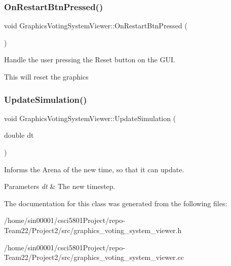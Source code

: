 \subsubsection{\texorpdfstring{On\+Restart\+Btn\+Pressed()}{OnRestartBtnPressed()}}
{\footnotesize\ttfamily void Graphics\+Voting\+System\+Viewer\+::\+On\+Restart\+Btn\+Pressed (\begin{DoxyParamCaption}{ }\end{DoxyParamCaption})}



Handle the user pressing the Reset button on the G\+UI. 

This will reset the graphics \mbox{\label{classGraphicsVotingSystemViewer_a13ebb27a0162188b69b1bd01d29e45d5}} 
\subsubsection{\texorpdfstring{Update\+Simulation()}{UpdateSimulation()}}
{\footnotesize\ttfamily void Graphics\+Voting\+System\+Viewer\+::\+Update\+Simulation (\begin{DoxyParamCaption}\item[{double}]{dt }\end{DoxyParamCaption})\hspace{0.3cm}{\ttfamily [override]}}



Informs the Arena of the new time, so that it can update. 


\begin{DoxyParams}{Parameters}
{\em dt} & The new timestep. \\
\hline
\end{DoxyParams}


The documentation for this class was generated from the following files\+:\begin{DoxyCompactItemize}
\item 
/home/sin00001/csci5801\+Project/repo-\/\+Team22/\+Project2/src/graphics\+\_\+voting\+\_\+system\+\_\+viewer.\+h\item 
/home/sin00001/csci5801\+Project/repo-\/\+Team22/\+Project2/src/graphics\+\_\+voting\+\_\+system\+\_\+viewer.\+cc\end{DoxyCompactItemize}

